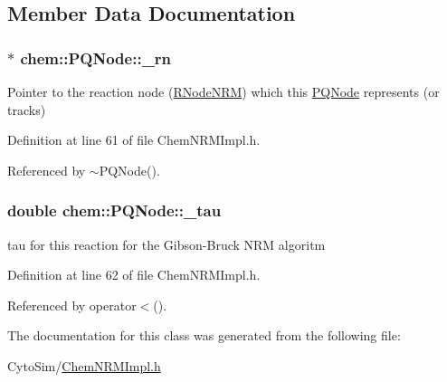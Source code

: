 \subsection{Member Data Documentation}
\hypertarget{classchem_1_1PQNode_ae0ddd94f908ec800ae02f592e83c630d}{
\subsubsection[{\-\_\-rn}]{$\ast$ {\bf chem\-::\-P\-Q\-Node\-::\-\_\-rn}}}\label{classchem_1_1PQNode_ae0ddd94f908ec800ae02f592e83c630d}


Pointer to the reaction node (\hyperlink{classchem_1_1RNodeNRM}{R\-Node\-N\-R\-M}) which this \hyperlink{classchem_1_1PQNode}{P\-Q\-Node} represents (or tracks) 



Definition at line 61 of file Chem\-N\-R\-M\-Impl.\-h.



Referenced by $\sim$\-P\-Q\-Node().

\hypertarget{classchem_1_1PQNode_a77a83fe486c496c3e4bd4ffa72d8fb57}{
\subsubsection[{\-\_\-tau}]{\setlength{\rightskip}{0pt plus 5cm}double {\bf chem\-::\-P\-Q\-Node\-::\-\_\-tau}}}\label{classchem_1_1PQNode_a77a83fe486c496c3e4bd4ffa72d8fb57}


tau for this reaction for the Gibson-\/\-Bruck N\-R\-M algoritm 



Definition at line 62 of file Chem\-N\-R\-M\-Impl.\-h.



Referenced by operator$<$().



The documentation for this class was generated from the following file\-:\begin{DoxyCompactItemize}
\item 
Cyto\-Sim/\hyperlink{ChemNRMImpl_8h}{Chem\-N\-R\-M\-Impl.\-h}\end{DoxyCompactItemize}
